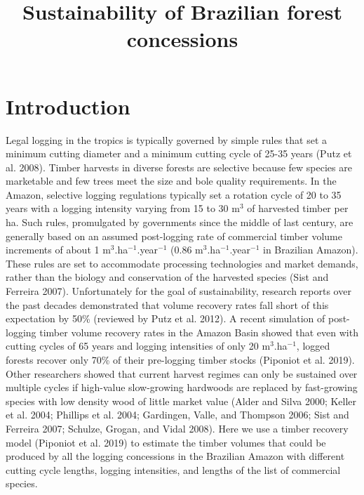 \documentclass[
]{article}
\title{Sustainability of Brazilian forest concessions}
\author{}
\date{\vspace{-2.5em}}
\begin{document}
\maketitle

{
\setcounter{tocdepth}{2}
\tableofcontents
}
\hypertarget{introduction}{%
\section{Introduction}\label{introduction}}

Legal logging in the tropics is typically governed by simple rules that set a minimum cutting diameter and a minimum cutting cycle of 25-35 years (Putz et al. 2008). Timber harvests in diverse forests are selective because few species are marketable and few trees meet the size and bole quality requirements. In the Amazon, selective logging regulations typically set a rotation cycle of 20 to 35 years with a logging intensity varying from 15 to 30 m\(^3\) of harvested timber per ha. Such rules, promulgated by governments since the middle of last century, are generally based on an assumed post-logging rate of commercial timber volume increments of about 1 m\(^3\).ha\(^{-1}\).year\(^{-1}\) (0.86 m\(^3\).ha\(^{-1}\).year\(^{-1}\) in Brazilian Amazon). These rules are set to accommodate processing technologies and market demands, rather than the biology and conservation of the harvested species (Sist and Ferreira 2007). Unfortunately for the goal of sustainability, research reports over the past decades demonstrated that volume recovery rates fall short of this expectation by 50\% (reviewed by Putz et al. 2012). A recent simulation of post-logging timber volume recovery rates in the Amazon Basin showed that even with cutting cycles of 65 years and logging intensities of only 20 m\(^3\).ha\(^{-1}\), logged forests recover only 70\% of their pre-logging timber stocks (Piponiot et al. 2019). Other researchers showed that current harvest regimes can only be sustained over multiple cycles if high-value slow-growing hardwoods are replaced by fast-growing species with low density wood of little market value (Alder and Silva 2000; Keller et al. 2004; Phillips et al. 2004; Gardingen, Valle, and Thompson 2006; Sist and Ferreira 2007; Schulze, Grogan, and Vidal 2008). Here we use a timber recovery model (Piponiot et al. 2019) to estimate the timber volumes that could be produced by all the logging concessions in the Brazilian Amazon with different cutting cycle lengths, logging intensities, and lengths of the list of commercial species.
\end{document}
